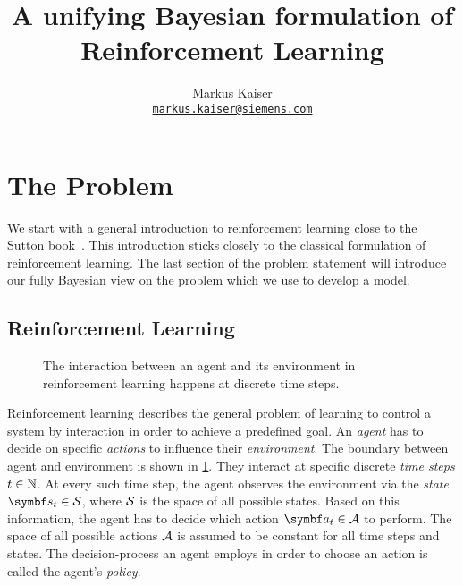 



\newcommand{\includestandalonewithpath}[2][]{%
    \begingroup%
    \StrCount{#2}{/}[\matches]%
    \StrBefore[\matches]{#2}{/}[\figurepath]%
    \endgroup%
}




\title{A unifying Bayesian formulation of Reinforcement Learning}
\author{
    Markus Kaiser\\
    \href{mailto:markus.kaiser@siemens.com}{\texttt{markus.kaiser@siemens.com}}
}
\makeatletter
\chead{\@title}
\makeatother


\maketitle


\section{The Problem}
\label{sec:problem}
We start with a general introduction to reinforcement learning close to the Sutton book~\parencite{sutton_reinforcement_1998}.
This introduction sticks closely to the classical formulation of reinforcement learning.
The last section of the problem statement will introduce our fully Bayesian view on the problem which we use to develop a model.


\subsection{Reinforcement Learning}
\label{sub:reinforcement_learning}
\begin{figure}[t]
    \centering
    
    \caption[Agent-environment interaction]{
        The interaction between an agent and its environment in reinforcement learning happens at discrete time steps.
    }
    \label{fig:agent_environment_interaction}
\end{figure}
Reinforcement learning describes the general problem of learning to control a system by interaction in order to achieve a predefined goal.
An \emph{agent} has to decide on specific \emph{actions} to influence their \emph{environment}.
The boundary between agent and environment is shown in \cref{fig:agent_environment_interaction}.
They interact at specific discrete \emph{time steps} $t \in \mathbb{N}$.
At every such time step, the agent observes the environment via the \emph{state} $\mat{s}_t \in \Es$, where $\mathcal{S}$ is the space of all possible states.
Based on this information, the agent has to decide which action $\mat{a}_t \in \Ah$ to perform.
The space of all possible actions $\mathcal{A}$ is assumed to be constant for all time steps and states.
The decision-process an agent employs in order to choose an action is called the agent's \emph{policy}.

